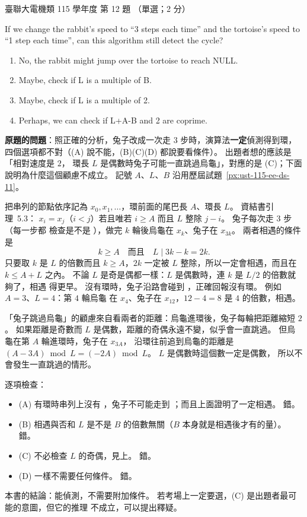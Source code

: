 \begin{pastexam}[label={px:ust-115-ee-ds-12}]{臺聯大電機類 115 學年度 第 12 題}
（單選；2 分）

If we change the rabbit's speed to ``3 steps each time'' and the tortoise's speed to ``1 step each
time'', can this algorithm still detect the cycle?
\begin{enumerate}[label=(\Alph*)]
\item No, the rabbit might jump over the tortoise to reach NULL.
\item Maybe, check if L is a multiple of B.
\item Maybe, check if L is a multiple of 2.
\item Perhaps, we can check if L+A-B and 2 are coprime.
\end{enumerate}
\end{pastexam}

\begin{pastsoln}
\textbf{原題的問題}：照正確的分析，兔子改成一次走 $3$ 步時，演算法\textbf{一定}偵測得到環，
四個選項都不對（(A) 說不能，(B)(C)(D) 都說要看條件）。 出題者想的應該是「相對速度是 $2$，
環長 $L$ 是偶數時兔子可能一直跳過烏龜」，對應的是 (C)；下面說明為什麼這個顧慮不成立。 記號
$A$、$L$、$B$ 沿用歷屆試題~\ref{px:ust-115-ee-ds-11}。

把串列的節點依序記為 $x_0, x_1, \ldots$，環前面的尾巴長 $A$、環長 $L$。 資結書引理~5.3：
$x_i = x_j$（$i < j$）若且唯若 $i \ge A$ 而且 $L$ 整除 $j - i$。 兔子每次走 $3$ 步（每一步都
檢查是不是 \NIL），做完 $k$ 輪後烏龜在 $x_k$、兔子在 $x_{3k}$。 兩者相遇的條件是
\[
k \ge A \quad\text{而且}\quad L \mid 3k - k = 2k .
\]
只要取 $k$ 是 $L$ 的倍數而且 $k \ge A$，$2k$ 一定被 $L$ 整除，所以一定會相遇，而且在
$k \le A + L$ 之內。 不論 $L$ 是奇是偶都一樣：$L$ 是偶數時，連 $k$ 是 $L/2$ 的倍數就夠了，相遇
得更早。 沒有環時，兔子沿路會碰到 \NIL，正確回報沒有環。 例如 $A = 3$、$L = 4$：第 $4$ 輪烏龜
在 $x_4$、兔子在 $x_{12}$，$12 - 4 = 8$ 是 $4$ 的倍數，相遇。

「兔子跳過烏龜」的顧慮來自看兩者的距離：烏龜進環後，兔子每輪把距離縮短 $2$。 如果距離是奇數而
$L$ 是偶數，距離的奇偶永遠不變，似乎會一直跳過。 但烏龜在第 $A$ 輪進環時，兔子在 $x_{3A}$，
沿環往前追到烏龜的距離是 $(A - 3A) \bmod L = (-2A) \bmod L$。 $L$ 是偶數時這個數一定是偶數，
所以不會發生一直跳過的情形。

逐項檢查：
\begin{itemize}
\item (A) 有環時串列上沒有 \NIL，兔子不可能走到 \NIL；而且上面證明了一定相遇。 錯。
\item (B) 相遇與否和 $L$ 是不是 $B$ 的倍數無關（$B$ 本身就是相遇後才有的量）。 錯。
\item (C) 不必檢查 $L$ 的奇偶，見上。 錯。
\item (D) 一樣不需要任何條件。 錯。
\end{itemize}
本書的結論：能偵測，不需要附加條件。 若考場上一定要選，(C) 是出題者最可能的意圖，但它的推理
不成立，可以提出釋疑。
\end{pastsoln}
